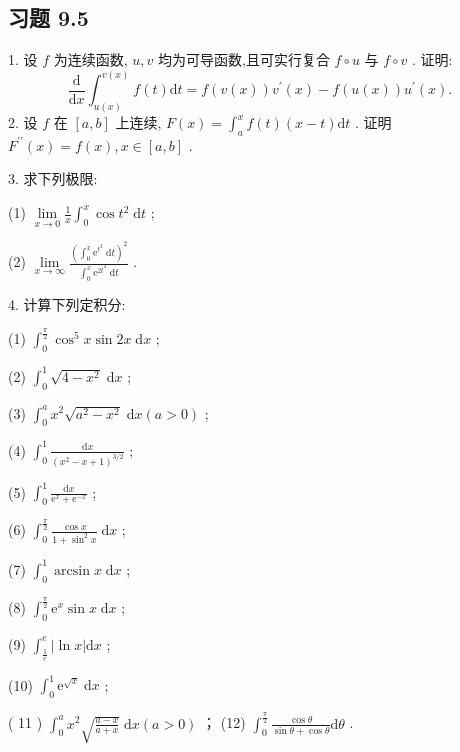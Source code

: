 \subsection{习题 9.5}

1. 设 \(f\) 为连续函数, \(u,v\) 均为可导函数,且可实行复合 \(f \circ  u\) 与 \(f \circ  v\) . 证明:
\[
\frac{\mathrm{d}}{\mathrm{d}x}{\int }_{u\left( x\right) }^{v\left( x\right) }f\left( t\right) \mathrm{d}t = f\left( {v\left( x\right) }\right) {v}^{\prime }\left( x\right)  - f\left( {u\left( x\right) }\right) {u}^{\prime }\left( x\right) .
\]
2. 设 \(f\) 在 \(\left\lbrack  {a,b}\right\rbrack\) 上连续, \(F\left( x\right)  = {\int }_{a}^{x}f\left( t\right) \left( {x - t}\right) \mathrm{d}t\) . 证明 \({F}^{\prime \prime }\left( x\right)  = f\left( x\right) ,x \in  \left\lbrack  {a,b}\right\rbrack\) .

3. 求下列极限:

(1) \(\mathop{\lim }\limits_{{x \rightarrow  0}}\frac{1}{x}{\int }_{0}^{x}\cos {t}^{2}\mathrm{\;d}t\) ;

(2) \(\mathop{\lim }\limits_{{x \rightarrow  \infty }}\frac{{\left( {\int }_{0}^{x}{\mathrm{e}}^{{t}^{2}}\mathrm{\;d}t\right) }^{2}}{{\int }_{0}^{x}{\mathrm{e}}^{2{t}^{2}}\mathrm{\;d}t}\) .

4. 计算下列定积分:

(1) \({\int }_{0}^{\frac{\pi }{2}}{\cos }^{5}x\sin {2x}\mathrm{\;d}x\) ;

(2) \({\int }_{0}^{1}\sqrt{4 - {x}^{2}}\mathrm{\;d}x\) ;

(3) \({\int }_{0}^{a}{x}^{2}\sqrt{{a}^{2} - {x}^{2}}\mathrm{\;d}x\left( {a > 0}\right)\) ;

(4) \({\int }_{0}^{1}\frac{\mathrm{d}x}{{\left( {x}^{2} - x + 1\right) }^{3/2}}\) ;

(5) \({\int }_{0}^{1}\frac{\mathrm{d}x}{{\mathrm{e}}^{x} + {\mathrm{e}}^{-x}}\) ;

(6) \({\int }_{0}^{\frac{\pi }{2}}\frac{\cos x}{1 + {\sin }^{2}x}\mathrm{\;d}x\) ;

(7) \({\int }_{0}^{1}\arcsin x\mathrm{\;d}x\) ;

(8) \({\int }_{0}^{\frac{\pi }{2}}{\mathrm{e}}^{x}\sin x\mathrm{\;d}x\) ;

(9) \({\int }_{\frac{1}{e}}^{e}\left| {\ln x}\right| \mathrm{d}x\) ;

(10) \({\int }_{0}^{1}{\mathrm{e}}^{\sqrt{x}}\mathrm{\;d}x\) ;

( 11 ) \({\int }_{0}^{a}{x}^{2}\sqrt{\frac{a - x}{a + x}}\mathrm{\;d}x\left( {a > 0}\right)\) ； (12) \({\int }_{0}^{\frac{\pi }{2}}\frac{\cos \theta }{\sin \theta  + \cos \theta }\mathrm{d}\theta\) .

